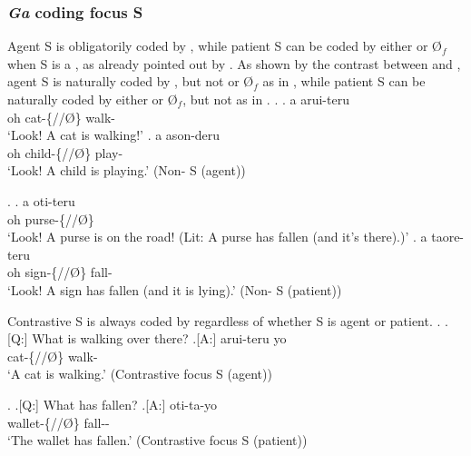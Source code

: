

\subsubsection{\textit{Ga} coding focus S}

Agent S is obligatorily coded by ,
while patient S can be coded by either  or {\O$_{f}$}
when S is a ,
as already pointed out by .
As shown by the contrast between \Next and \NNext,
agent S is naturally coded by ,
but not  or {\O$_{f}$} as in \Next,
while patient S can be naturally coded by either  or {\O$_{f}$},
but not  as in \NNext.
%
\ex.\label{ExAgentS}
	\ag. a  arui-teru \\
	oh cat-\{//\O\} walk- \\
	`Look! A cat is walking!'
	\bg. a  ason-deru \\
		oh child-\{//\O\} play- \\
		`Look! A child is playing.' \hfill{(Non- S (agent))}

\ex.\label{ExPatientS}
	\ag. a  oti-teru \\
		oh purse-\{//\O\} \\
		`Look! A purse is on the road! (Lit: A purse has fallen (and it's there).)'
	\bg. a  taore-teru \\
		oh sign-\{//\O\} fall- \\
		`Look! A sign has fallen (and it is lying).' \hfill{(Non- S (patient))}


Contrastive S is always coded by 
regardless of whether S is agent or patient.
%
\ex.
 \a.[Q:] What is walking over there?
 \bg.[A:]  arui-teru yo \\
	cat-\{//\O\} walk-  \\
	`A cat is walking.' \hfill{(Contrastive focus S (agent))}

\ex. \a.[Q:] What has fallen?
	\bg.[A:]  oti-ta-yo \\
			wallet-\{//\O\} fall-- \\
			`The wallet has fallen.' \hfill{(Contrastive focus S (patient))}

